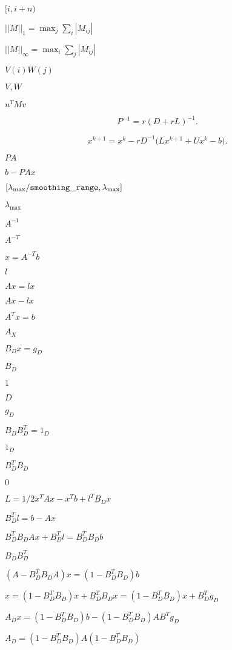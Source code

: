 \documentclass{article}
\begin{document}
$[i,i+n)$
\pagebreak

$||M||_1 = \max_j \sum_i |M_{ij}|$
\pagebreak

$||M||_\infty = \max_i \sum_j |M_{ij}|$
\pagebreak

$V(i) W(j)$
\pagebreak

$V,W$
\pagebreak

$u^TMv$
\pagebreak

\[ P^{-1} = r (D+rL)^{-1}. \]
\pagebreak

\[ x^{k+1} = x^k - r D^{-1} \bigl(L x^{k+1} + U x^k - b\bigr). \]
\pagebreak

$PA$
\pagebreak

$b-PAx$
\pagebreak

$[\lambda_\mathrm{max}/ \tt{smoothing\_range}, \lambda_\mathrm{max}]$
\pagebreak

$\lambda_\mathrm{max}$
\pagebreak

$A^{-1}$
\pagebreak

$A^{-T}$
\pagebreak

$x=A^{-T}b$
\pagebreak

$l$
\pagebreak

$Ax = lx$
\pagebreak

$A x - l x$
\pagebreak

$A^Tx=b$
\pagebreak

$A_X$
\pagebreak

$B_D x = g_D$
\pagebreak

$B_D$
\pagebreak

$1$
\pagebreak

$D$
\pagebreak

$g_D$
\pagebreak

$B_D B_D^T = 1_D$
\pagebreak

$1_D$
\pagebreak

$B_D^T B_D$
\pagebreak

$0$
\pagebreak

$L=1/2 x^T A x - x^T b + l^T B_D x$
\pagebreak

$B_D^T l = b-Ax$
\pagebreak

$B_D^T B_D A x + B_D^T l = B_D^T B_D b$
\pagebreak

$B_D B_D^T$
\pagebreak

$(A - B_D^T B_D A) x = (1 - B_D^T B_D)b$
\pagebreak

$x=(1 - B_D^T B_D) x + B_D^T B_D x = (1 - B_D^T B_D) x + B_D^T g_D$
\pagebreak

$A_D x = (1 - B_D^T B_D)b - (1 - B_D^T B_D) A B^T g_D$
\pagebreak

$A_D = (1 - B_D^T B_D) A (1 - B_D^T B_D)$
\pagebreak
\end{document}
